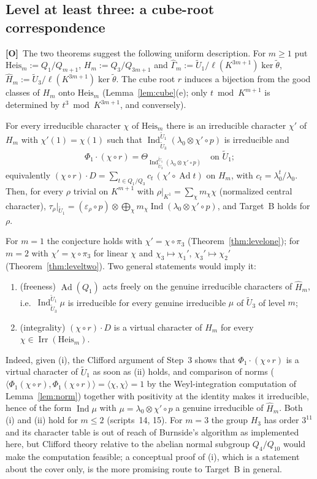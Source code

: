 \documentclass[11pt]{article}
\newcommand{\Irr}{\operatorname{Irr}}
\newcommand{\Ind}{\operatorname{Ind}}
\newcommand{\Ad}{\operatorname{Ad}}
\newcommand{\tU}{\widetilde U}
\newcommand{\tth}{\widetilde\theta}
\newcommand{\Otag}{\textnormal{\textbf{[O]}}}
\theoremstyle{plain}
\theoremstyle{definition}
\begin{document}
\subsection{Level at least three: a cube-root correspondence}\label{subsec:cuberoot}
\Otag\ The two theorems suggest the following uniform description.  For
$m\ge1$ put $\mathrm{Heis}_m:=Q_1/Q_{m+1}$, $H_m:=Q_3/Q_{3m+1}$ and
$\hat\Gamma_m:=\tU_1/\ell(K^{3m+1})\ker\tth$, $\hat H_m:=\tU_3/\ell(K^{3m+1})\ker\tth$.
The cube root $r$ induces a bijection from the good classes of $H_m$
onto $\mathrm{Heis}_m$ (Lemma~\ref{lem:cube}(e); only $t\bmod K^{m+1}$
is determined by $t^3\bmod K^{3m+1}$, and conversely).

\begin{description}[style=nextline]
\item[Conjecture (cube-root correspondence).]  For every irreducible
character $\chi$ of $\mathrm{Heis}_m$ there is an irreducible character
$\chi'$ of $H_m$ with $\chi'(1)=\chi(1)$ such that
$\Ind_{\tU_3}^{\tU_1}(\lambda_0\otimes\chi'\circ p)$ is irreducible and
\[
 \Phi_1\cdot(\chi\circ r)=\Theta_{\Ind_{\tU_3}^{\tU_1}(\lambda_0\otimes\chi'\circ p)}\quad\text{on }\tU_1 ;
\]
equivalently $(\chi\circ r)\cdot D=\sum_{t\in Q_1/Q_3}c_t\,(\chi'\circ\Ad t)$
on $H_m$, with $c_t=\lambda_0^t/\lambda_0$.  Then, for every $\rho$
trivial on $K^{m+1}$ with $\rho|_{K^1}=\sum_\chi m_\chi\chi$ (normalized
central character), $\tau_\rho|_{\tU_1}=(\varepsilon_\rho\circ p)\otimes\bigoplus_\chi m_\chi\Ind(\lambda_0\otimes\chi'\circ p)$,
and Target~B holds for $\rho$.
\end{description}
For $m=1$ the conjecture holds with $\chi'=\chi\circ\pi_3$
(Theorem~\ref{thm:levelone}); for $m=2$ with $\chi'=\chi\circ\pi_3$ for
linear $\chi$ and $\chi_3\mapsto\chi_1'$, $\chi_3'\mapsto\chi_2'$
(Theorem~\ref{thm:leveltwo}).  Two general statements would imply it:
\begin{enumerate}[label=(\roman*)]
\item (freeness) $\Ad(Q_1)$ acts freely on the genuine irreducible
characters of $\hat H_m$, i.e.\ $\Ind_{\tU_3}^{\tU_1}\mu$ is irreducible
for every genuine irreducible $\mu$ of $\tU_3$ of level $m$;
\item (integrality) $(\chi\circ r)\cdot D$ is a virtual character of
$H_m$ for every $\chi\in\Irr(\mathrm{Heis}_m)$.
\end{enumerate}
Indeed, given (i), the Clifford argument of Step~3 shows that
$\Phi_1\cdot(\chi\circ r)$ is a virtual character of $\tU_1$ as soon as
(ii) holds, and comparison of norms
($\langle\Phi_1(\chi\circ r),\Phi_1(\chi\circ r)\rangle=\langle\chi,\chi\rangle=1$
by the Weyl-integration computation of Lemma~\ref{lem:norm}) together
with positivity at the identity makes it irreducible, hence of the form
$\Ind\mu$ with $\mu=\lambda_0\otimes\chi'\circ p$ a genuine irreducible
of $\hat H_m$.  Both (i) and (ii) hold for $m\le2$ (scripts~14, 15).
For $m=3$ the group $H_3$ has order $3^{11}$ and its character table
is out of reach of Burnside's algorithm as implemented here, but
Clifford theory relative to the abelian normal subgroup $Q_4/Q_{10}$
would make the computation feasible; a conceptual proof of (i), which
is a statement about the cover only, is the more promising route to
Target~B in general.
\end{document}
